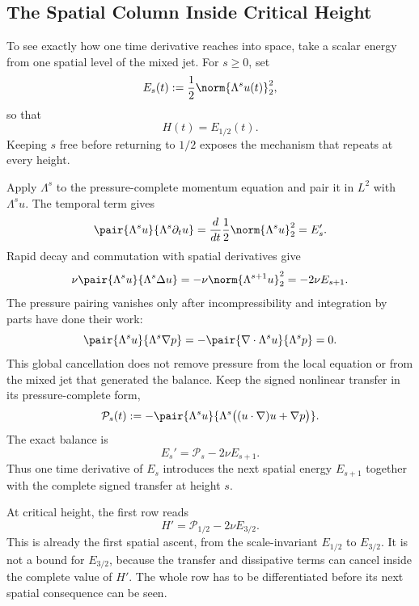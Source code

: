 
\subsection{The Spatial Column Inside Critical Height}\label{sub:TheSpatialColumnInsideCriticalHeight}

To see exactly how one time derivative reaches into space, take a scalar energy from one spatial level of the mixed jet.
For \(s\ge0\), set
\[
  E_s(t)
  :=
  \frac12\norm{\Lambda^su(t)}_2^2,
\]
so that
\[
  H(t)=E_{1/2}(t).
\]
Keeping \(s\) free before returning to \(1/2\) exposes the mechanism that repeats at every height.

Apply \(\Lambda^s\) to the pressure-complete momentum equation and pair it in \(L^2\) with \(\Lambda^su\).
The temporal term gives
\[
  \pair{\Lambda^su}{\Lambda^s\partial_tu}
  =
  \frac{d}{dt}\frac12\norm{\Lambda^su}_2^2
  =
  E_s'.
\]
Rapid decay and commutation with spatial derivatives give
\[
  \nu\pair{\Lambda^su}{\Lambda^s\Delta u}
  =
  -\nu\norm{\Lambda^{s+1}u}_2^2
  =
  -2\nu E_{s+1}.
\]
The pressure pairing vanishes only after incompressibility and integration by parts have done their work:
\[
  \pair{\Lambda^su}{\Lambda^s\nabla p}
  =
  -\pair{\nabla\cdot\Lambda^su}{\Lambda^sp}
  =
  0.
\]
This global cancellation does not remove pressure from the local equation or from the mixed jet that generated the balance.
Keep the signed nonlinear transfer in its pressure-complete form,
\[
  \mathcal P_s(t)
  :=
  -\pair{\Lambda^su}
  {\Lambda^s\bigl((u\cdot\nabla)u+\nabla p\bigr)}.
\]
The exact balance is
\[
  E_s'
  =
  \mathcal P_s-2\nu E_{s+1}.
\]
Thus one time derivative of \(E_s\) introduces the next spatial energy \(E_{s+1}\) together with the complete signed transfer at height \(s\).

At critical height, the first row reads
\[
  H'
  =
  \mathcal P_{1/2}-2\nu E_{3/2}.
\]
This is already the first spatial ascent, from the scale-invariant \(E_{1/2}\) to \(E_{3/2}\).
It is not a bound for \(E_{3/2}\), because the transfer and dissipative terms can cancel inside the complete value of \(H'\).
The whole row has to be differentiated before its next spatial consequence can be seen.

